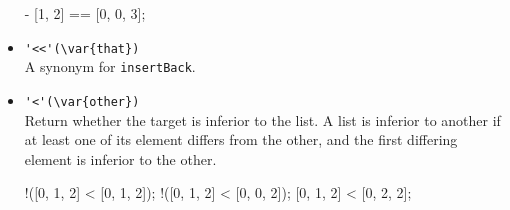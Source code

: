 \begin{itemize}
\begin{urbiassert}[firstnumber=last]
[0, 1, 0, 2, 3] - [1, 2] == [0, 0, 3];
\end{urbiassert}

\item \lstinline|'<<'(\var{that})|\\
  A synonym for \lstinline|insertBack|.

\item \lstinline|'<'(\var{other})|\\
  Return whether the target is inferior to the  list. A
  list is inferior to another if at least one of its element differs
  from the other, and the first differing element is inferior to the
  other.

\begin{urbiassert}[firstnumber=last]
!([0, 1, 2] < [0, 1, 2]);
!([0, 1, 2] < [0, 0, 2]);
[0, 1, 2] < [0, 2, 2];
\end{urbiassert}

\end{itemize}


